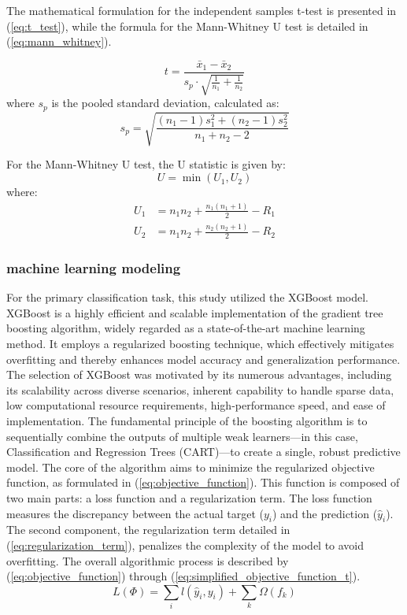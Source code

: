 The mathematical formulation for the independent samples t-test is presented in (\ref{eq:t_test}), while the formula for the Mann-Whitney U test is detailed in (\ref{eq:mann_whitney}).

\begin{equation} \label{eq:t_test}
t = \frac{\bar{x}_1 - \bar{x}_2}{s_p \cdot \sqrt{\frac{1}{n_1} + \frac{1}{n_2}}}
\end{equation}
where $s_p$ is the pooled standard deviation, calculated as:
\begin{equation} \label{eq:sp_pooled}
s_p = \sqrt{\frac{(n_1 - 1)s_1^2 + (n_2 - 1)s_2^2}{n_1 + n_2 - 2}}
\end{equation}

For the Mann-Whitney U test, the U statistic is given by:
\begin{equation} \label{eq:mann_whitney}
U = \min(U_1, U_2)
\end{equation}
where:
\begin{align}
U_1 &= n_1n_2 + \frac{n_1(n_1 + 1)}{2} - R_1 \label{eq:U1} \\
U_2 &= n_1n_2 + \frac{n_2(n_2 + 1)}{2} - R_2 \label{eq:U2}
\end{align}
\subsubsection{machine learning modeling}
For the primary classification task, this study utilized the XGBoost model\cite{mthd05}. XGBoost is a highly efficient and scalable implementation of the gradient tree boosting algorithm, widely regarded as a state-of-the-art machine learning method. It employs a regularized boosting technique, which effectively mitigates overfitting and thereby enhances model accuracy and generalization performance. The selection of XGBoost was motivated by its numerous advantages, including its scalability across diverse scenarios, inherent capability to handle sparse data, low computational resource requirements, high-performance speed, and ease of implementation. The fundamental principle of the boosting algorithm is to sequentially combine the outputs of multiple weak learners---in this case, Classification and Regression Trees (CART)---to create a single, robust predictive model. The core of the algorithm aims to minimize the regularized objective function, as formulated in (\ref{eq:objective_function}). This function is composed of two main parts: a loss function and a regularization term. The loss function measures the discrepancy between the actual target ($y_i$) and the prediction ($\hat{y}_i$). The second component, the regularization term detailed in (\ref{eq:regularization_term}), penalizes the complexity of the model to avoid overfitting. The overall algorithmic process is described by (\ref{eq:objective_function}) through (\ref{eq:simplified_objective_function_t}).
\begin{equation} \label{eq:objective_function}
L(\Phi) = \sum_i l(\hat{y}_i, y_i) + \sum_k \Omega(f_k)
\end{equation}

